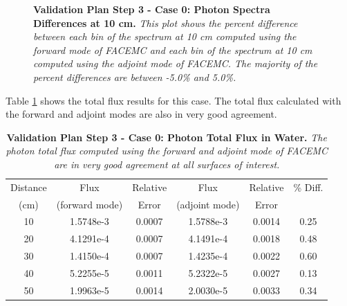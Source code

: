 \begin{figure}[t!]
  \begin{center}
  \end{center}
  \caption{\textbf{Validation Plan Step 3 - Case 0: Photon Spectra Differences
      at 10 cm.}
    \textit{This plot shows the percent difference between each bin of the
      spectrum at 10 cm computed using the forward mode of FACEMC and each bin
      of the spectrum at 10 cm computed using the adjoint mode of FACEMC. The 
      majority of the percent differences are between -5.0\% and 5.0\%.}}
  \label{fig:val_plan_s3_c0_spectrum_diffs_water}
\end{figure}
Table \ref{table:val_plan_s3_c0_flux_water} shows the total flux results
for this case. The total flux calculated with the forward and adjoint modes are
also in very good agreement.
\begin{table}[ht]
  \caption{\textbf{Validation Plan Step 3 - Case 0: Photon Total Flux in Water.}
    \textit{The photon total flux computed using the forward and adjoint
      mode of FACEMC are in very good agreement at all surfaces of
      interest.}}
  \centering
  \begin{tabular}{c c c c c c}
    \hline\hline
    Distance & Flux & Relative & Flux & Relative & \% Diff. \\ 
    (cm) & (forward mode) & Error & (adjoint mode) & Error &  \\ [0.5ex]
    \hline
    10 & 1.5748e-3 & 0.0007 & 1.5788e-3 & 0.0014 & 0.25 \\
    20 & 4.1291e-4 & 0.0007 & 4.1491e-4 & 0.0018 & 0.48 \\
    30 & 1.4150e-4 & 0.0007 & 1.4235e-4 & 0.0022 & 0.60 \\
    40 & 5.2255e-5 & 0.0011 & 5.2322e-5 & 0.0027 & 0.13 \\
    50 & 1.9963e-5 & 0.0014 & 2.0030e-5 & 0.0033 & 0.34 \\ [1ex]
    \hline
  \end{tabular}
  \label{table:val_plan_s3_c0_flux_water}
\end{table}

